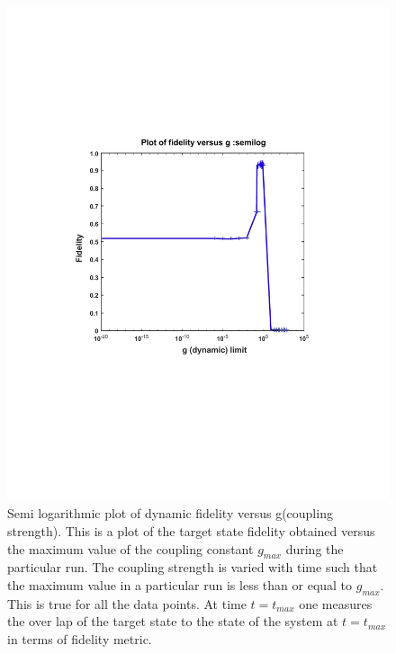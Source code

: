\begin{center}
\begin{figure}%
\includegraphics[width=1.1\textwidth]{H-fk_fidelity_static_g__semilog_large_range_-_Final}
\caption{Semi logarithmic plot of dynamic fidelity versus g(coupling strength). This is a plot of the target state fidelity obtained versus the maximum value of the coupling constant $g_{max}$ during the particular run. The coupling strength is varied with time such that the maximum value  in a particular run is less than or equal to $g_{max}$. This is true for all the data points. At time $t=t_{max}$ one measures the over lap of the target state to the state of the system at $t=t_{max}$ in terms of fidelity metric.     }
\label{H-fk_fidelity_static_g__semilog_large_range_-_Final}
\end{figure}
\end{center}

